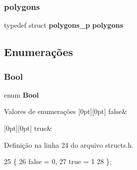 \mbox{\label{structs_8h_ac5b73f53e77194cbb466c1902f92ace0}} 
\subsubsection{polygons}
{\footnotesize\ttfamily typedef struct \textbf{ polygons\+\_\+p} \textbf{ polygons}}



\subsection{Enumerações}
\mbox{\label{structs_8h_a39db6982619d623273fad8a383489309}} 
\subsubsection{Bool}
{\footnotesize\ttfamily enum \textbf{ Bool}}

\begin{DoxyEnumFields}{Valores de enumerações}
[0pt][0pt]{}\mbox{\label{structs_8h_a39db6982619d623273fad8a383489309ae9de385ef6fe9bf3360d1038396b884c}} 
false&\\
\hline

[0pt][0pt]{}\mbox{\label{structs_8h_a39db6982619d623273fad8a383489309a08f175a5505a10b9ed657defeb050e4b}} 
true&\\
\hline

\end{DoxyEnumFields}


Definição na linha 24 do arquivo structs.\+h.


\begin{DoxyCode}
25 \{
26     \textcolor{keyword}{false} = 0,
27     \textcolor{keyword}{true} = 1
28 \};
\end{DoxyCode}
